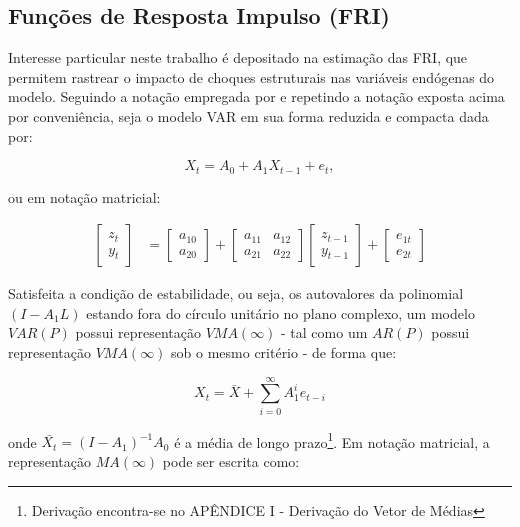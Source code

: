 \subsection{Funções de Resposta Impulso (FRI)}


Interesse particular neste trabalho é depositado na estimação das FRI, que permitem rastrear o impacto de choques estruturais nas variáveis endógenas do modelo. Seguindo a notação empregada por \textcite{enders_applied_2015} e repetindo a notação exposta acima por conveniência, seja o modelo VAR em sua forma reduzida e compacta dada por: 

\begin{equation}
X_t = A_0 + A_1X_{t-1} + e_t, 
\end{equation}

ou em notação matricial: 

\begin{equation}\begin{aligned} \begin{bmatrix}
        z_t \\ y_t \end{bmatrix} &=\begin{bmatrix}
        a_{10} \\ a_{20}\end{bmatrix} +
    \begin{bmatrix}a_{11} & a_{12} \\a_{21} & a_{22}
    \end{bmatrix}\begin{bmatrix} z_{t-1} \\ y_{t-1}
    \end{bmatrix}  +\begin{bmatrix} e_{1t} \\ e_{2t}
    \end{bmatrix}\end{aligned}\end{equation}

Satisfeita a condição de estabilidade, ou seja,  os autovalores da polinomial \((I - A_1L)\) estando fora do círculo unitário no plano complexo, um modelo \(VAR(P)\) possui representação \(VMA(\infty)\) - tal como um \(AR(P)\) possui  representação \(VMA(\infty)\) sob o mesmo critério - de forma que:

\begin{equation}
X_t =  \bar{X} + \sum_{i=0}^{\infty} A_1^i e_{t-i}
\end{equation}

onde \(\bar{X_t} = (I - A_1)^{-1}A_0\) é a média de longo prazo\footnote{Derivação encontra-se no APÊNDICE I - Derivação do Vetor de Médias}. Em notação matricial, a representação \(MA(\infty)\) pode ser escrita como:

